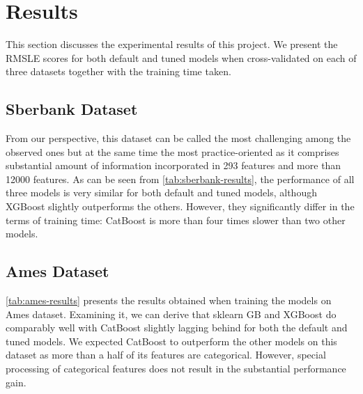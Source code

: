 \section{Results}
\label{sec:results}
This section discusses the experimental results of this project. We present the RMSLE scores for both default and tuned models when cross-validated on each of three datasets together with the training time taken.  

\subsection{Sberbank Dataset}
From our perspective, this dataset can be called the most challenging among the observed ones but at the same time the most practice-oriented as it comprises substantial amount of information incorporated in 293 features and more than 12000 features. As can be seen from \cref{tab:sberbank-results}, the performance of all three models is very similar for both default and tuned models, although XGBoost slightly outperforms the others. However, they significantly differ in the terms of training time: CatBoost is more than four times slower than two other models. 

\begin{table}[htbp]
	\centering
	\caption{Sberbank dataset results}
	\label{tab:sberbank-results}
\end{table}

\subsection{Ames Dataset}
\cref{tab:ames-results} presents the results obtained when training the models on Ames dataset. Examining it, we can derive that sklearn GB and XGBoost do comparably well with CatBoost slightly lagging behind for both the default and tuned models. We expected CatBoost to outperform the other models on this dataset as more than a half of its features are categorical. However, special processing of categorical features does not result in the substantial performance gain.

